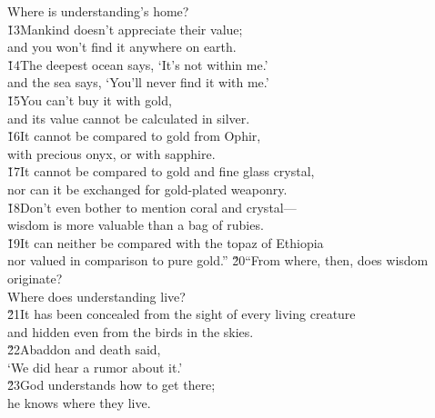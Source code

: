 \begin{poetry}
\poemll    Where is understanding's home? \\
\poeml \v{13}Mankind doesn't appreciate their value; \\
\poemll    and you won't find it anywhere on earth. \\
\poeml \v{14}The deepest ocean says, `It's not within me.' \\
\poemll    and the sea says, `You'll never find it with me.' \\
\poeml \v{15}You can't buy it with gold, \\
\poemll    and its value cannot be calculated in silver. \\
\poeml \v{16}It cannot be compared to gold from Ophir, \\
\poemll    with precious onyx, or with sapphire. \\
\poeml \v{17}It cannot be compared to gold and fine glass crystal, \\
\poemll    nor can it be exchanged for gold-plated weaponry. \\
\poeml \v{18}Don't even bother to mention coral and crystal--- \\
\poemll    wisdom is more valuable than a bag of rubies. \\
\poeml \v{19}It can neither be compared with the topaz of Ethiopia \\
\poemll    nor valued in comparison to pure gold.''
\poeml \v{20}``From where, then, does wisdom originate? \\
\poemll    Where does understanding live? \\
\poeml \v{21}It has been concealed from the sight of every living creature \\
\poemll    and hidden even from the birds in the skies. \\
\poeml \v{22}Abaddon and death said, \\
\poemll    `We did hear a rumor about it.' \\
\poeml \v{23}God understands how to get there; \\
\poemll    he knows where they live. \\

\end{poetry}
